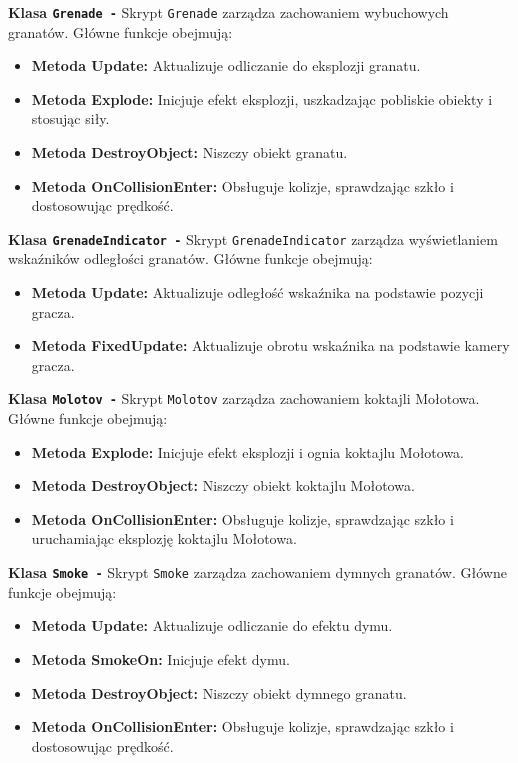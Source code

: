 \textbf{Klasa \texttt{Grenade -}}
Skrypt \texttt{Grenade} zarządza zachowaniem wybuchowych granatów. Główne funkcje obejmują:
\begin{itemize}
  \item \textbf{Metoda Update:} Aktualizuje odliczanie do eksplozji granatu.
  \item \textbf{Metoda Explode:} Inicjuje efekt eksplozji, uszkadzając pobliskie obiekty i stosując siły.
  \item \textbf{Metoda DestroyObject:} Niszczy obiekt granatu.
  \item \textbf{Metoda OnCollisionEnter:} Obsługuje kolizje, sprawdzając szkło i dostosowując prędkość.
\end{itemize}

\textbf{Klasa \texttt{GrenadeIndicator -}}
Skrypt \texttt{GrenadeIndicator} zarządza wyświetlaniem wskaźników odległości granatów. Główne funkcje obejmują:
\begin{itemize}
  \item \textbf{Metoda Update:} Aktualizuje odległość wskaźnika na podstawie pozycji gracza.
  \item \textbf{Metoda FixedUpdate:} Aktualizuje obrotu wskaźnika na podstawie kamery gracza.
\end{itemize}

\textbf{Klasa \texttt{Molotov -}}
Skrypt \texttt{Molotov} zarządza zachowaniem koktajli Mołotowa. Główne funkcje obejmują:
\begin{itemize}
  \item \textbf{Metoda Explode:} Inicjuje efekt eksplozji i ognia koktajlu Mołotowa.
  \item \textbf{Metoda DestroyObject:} Niszczy obiekt koktajlu Mołotowa.
  \item \textbf{Metoda OnCollisionEnter:} Obsługuje kolizje, sprawdzając szkło i uruchamiając eksplozję koktajlu Mołotowa.
\end{itemize}

\textbf{Klasa \texttt{Smoke -}}
Skrypt \texttt{Smoke} zarządza zachowaniem dymnych granatów. Główne funkcje obejmują:
\begin{itemize}
  \item \textbf{Metoda Update:} Aktualizuje odliczanie do efektu dymu.
  \item \textbf{Metoda SmokeOn:} Inicjuje efekt dymu.
  \item \textbf{Metoda DestroyObject:} Niszczy obiekt dymnego granatu.
  \item \textbf{Metoda OnCollisionEnter:} Obsługuje kolizje, sprawdzając szkło i dostosowując prędkość.
\end{itemize}

